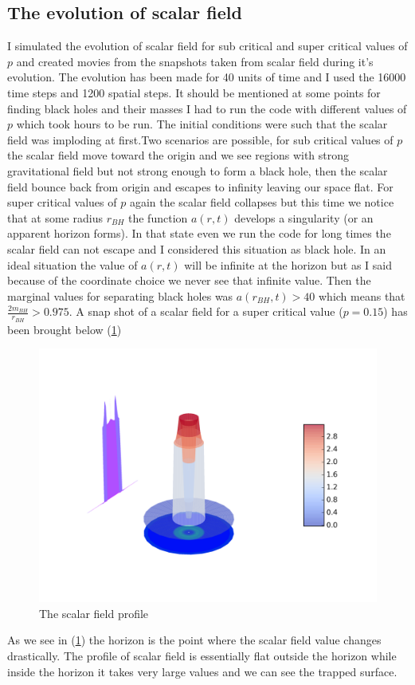 \documentclass[a4paper,11pt]{article}
\begin{document}
\subsection{The evolution of scalar field}
I simulated the evolution of scalar field for sub critical and super critical values of $p$ and created movies from the snapshots taken from scalar field during it's evolution. The evolution has been made for 40 units of time and I used the 16000 time steps and 1200 spatial steps. It should be mentioned at some points for finding black holes and their masses I had to run the code with different values  of $p$ which took hours to be run. The initial conditions were such that the scalar field was imploding at first.Two scenarios are possible, for sub critical values of $p$ the scalar field move toward the origin and we see regions with strong gravitational field but not strong enough to form a black hole, then the scalar  field bounce back from origin and escapes to infinity leaving our space flat. For super critical values of $p$ again the scalar field collapses but this time we notice that at some radius $r_{BH}$ the function $a(r,t)$ develops a singularity (or an apparent horizon forms). In that state even we run the code for long times the scalar field can not escape and I considered this situation as black hole. In an ideal situation the value of $a(r,t)$  will be infinite at the horizon but as I said because of the coordinate choice we never see that infinite value. Then the marginal values for separating black holes was $a(r_{BH},t)>40$ which means that $\frac{2m_{BH}}{r_{BH}}>0.975$. A snap shot of a scalar field for a super critical value ($p=0.15$) has been brought below (\ref{fig1})
\begin{figure}[H]
	\centering
	\includegraphics[width=\textwidth]{plot059}
	\caption{The scalar field profile\label{fig1}}
\end{figure}
As we see in (\ref{fig1}) the horizon is the point where the scalar field value changes drastically. The profile of scalar field is essentially flat outside the horizon while inside the horizon it takes very large values and we can see the trapped surface.
\end{document}
